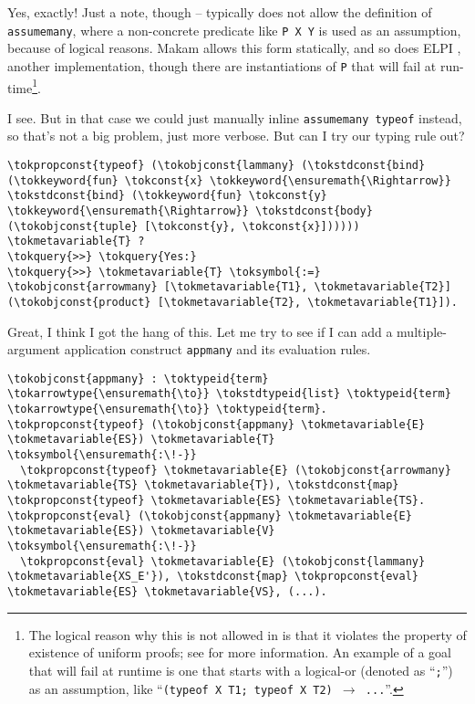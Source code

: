 \heroADVISOR{} Yes, exactly! Just a note, though -- \lamprolog typically does
not allow the definition of \texttt{assumemany}, where a non-concrete
predicate like \texttt{P\ X\ Y} is used as an assumption, because of
logical reasons. Makam allows this form statically, and so does ELPI
\citep{elpi-main-reference}, another \lamprolog implementation, though
there are instantiations of \texttt{P} that will fail at
run-time\footnote{The logical reason why this is not allowed in \lamprolog is that it violates the property of existence of uniform proofs; see \citet{assumemany-issue} for more information. An example of a goal that will fail at runtime is one that starts with a logical-or (denoted as ``\texttt{;}'') as an assumption, like ``\texttt{(typeof X T1; typeof X T2) \ensuremath{\to} ...}''.}.

\heroSTUDENT{} I see. But in that case we could just manually inline
\texttt{assumemany\ typeof} instead, so that's not a big problem, just
more verbose. But can I try our typing rule out?

\begin{verbatim}
\tokpropconst{typeof} (\tokobjconst{lammany} (\tokstdconst{bind} (\tokkeyword{fun} \tokconst{x} \tokkeyword{\ensuremath{\Rightarrow}} \tokstdconst{bind} (\tokkeyword{fun} \tokconst{y} \tokkeyword{\ensuremath{\Rightarrow}} \tokstdconst{body} (\tokobjconst{tuple} [\tokconst{y}, \tokconst{x}]))))) \tokmetavariable{T} ?
\tokquery{>>} \tokquery{Yes:}
\tokquery{>>} \tokmetavariable{T} \toksymbol{:=} \tokobjconst{arrowmany} [\tokmetavariable{T1}, \tokmetavariable{T2}] (\tokobjconst{product} [\tokmetavariable{T2}, \tokmetavariable{T1}]).
\end{verbatim}

\noindent
Great, I think I got the hang of this. Let me try to see if I can add a
multiple-argument application construct \texttt{appmany} and its
evaluation rules.

\begin{verbatim}
\tokobjconst{appmany} : \toktypeid{term} \tokarrowtype{\ensuremath{\to}} \tokstdtypeid{list} \toktypeid{term} \tokarrowtype{\ensuremath{\to}} \toktypeid{term}.
\tokpropconst{typeof} (\tokobjconst{appmany} \tokmetavariable{E} \tokmetavariable{ES}) \tokmetavariable{T} \toksymbol{\ensuremath{:\!-}}
  \tokpropconst{typeof} \tokmetavariable{E} (\tokobjconst{arrowmany} \tokmetavariable{TS} \tokmetavariable{T}), \tokstdconst{map} \tokpropconst{typeof} \tokmetavariable{ES} \tokmetavariable{TS}.
\tokpropconst{eval} (\tokobjconst{appmany} \tokmetavariable{E} \tokmetavariable{ES}) \tokmetavariable{V} \toksymbol{\ensuremath{:\!-}}
  \tokpropconst{eval} \tokmetavariable{E} (\tokobjconst{lammany} \tokmetavariable{XS_E'}), \tokstdconst{map} \tokpropconst{eval} \tokmetavariable{ES} \tokmetavariable{VS}, (...).
\end{verbatim}

